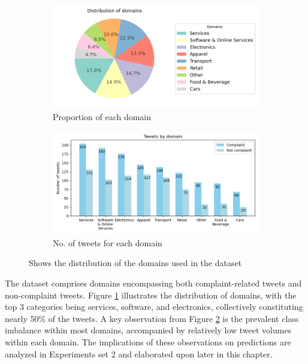 \begin{figure}[htbp]
    \centering
    \captionsetup{font=small}
    \begin{subfigure}{0.49\textwidth}
        \centering
        \includegraphics[width=\linewidth]{figures/domain_dist.png}
        \caption{Proportion of each domain}
        \label{fig: domain_dist_pct}
    \end{subfigure}
    \hfill
    \begin{subfigure}{0.49\textwidth}
        \centering
        \includegraphics[width=\linewidth]{figures/domain_counts_bar_norandom.png}
        \caption{No. of tweets for each domain}
        \label{fig: domain_dist_count}
    \end{subfigure}
    \caption{Shows the distribution of the domains used in the dataset}
    \label{fig: compl_main_dist}
\end{figure}

The dataset comprises domains encompassing both complaint-related tweets and non-complaint tweets. Figure \ref{fig: domain_dist_pct} illustrates the distribution of domains, with the top 3 categories being services, software, and electronics, collectively constituting nearly 50\% of the tweets. A key observation from Figure \ref{fig: domain_dist_count} is the prevalent class imbalance within most domains, accompanied by relatively low tweet volumes within each domain. The implications of these observations on predictions are analyzed in Experiments set 2 and elaborated upon later in this chapter.

